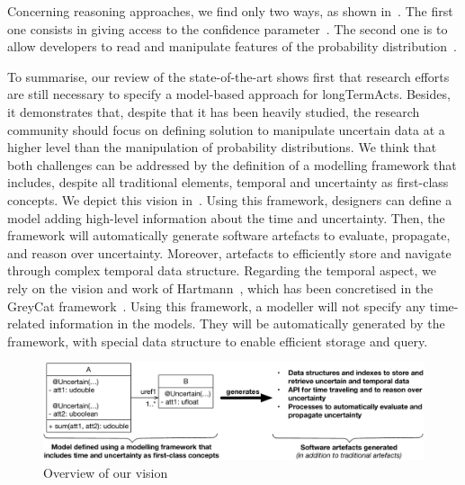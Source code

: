 Concerning reasoning approaches, we find only two ways, as shown in~.
The first one consists in giving access to the confidence parameter~\cite{DBLP:conf/models/BurguenoBMV18, DBLP:conf/ecmdafa/BertoaMBBTV18, DBLP:conf/sle/MayerhoferWV16, DBLP:conf/quatic/VallecilloMO16, DBLP:journals/tkde/BarbaraGP92, DBLP:conf/uist/SchwarzMH11}.
The second one is to allow developers to read and manipulate features of the probability distribution~\cite{baudin2017openturns, DBLP:conf/asplos/BornholtMM14, DBLP:journals/corr/BorgstromGGMG13, osti_1430202, DBLP:journals/peerj-cs/SalvatierWF16, DBLP:conf/popl/BhatAVG12, DBLP:conf/aistats/ChagantyNR13, DBLP:journals/siamsc/JaroszewiczK12, DBLP:journals/toplas/ParkPT08, DBLP:conf/ijcai/Pfeffer01, DBLP:conf/popl/RamseyP02, DBLP:conf/pldi/SankaranarayananCG13, DBLP:conf/icra/Thrun00, DBLP:journals/sac/LunnTBS00, plummer2003jags}.

To summarise, our review of the state-of-the-art shows first that research efforts are still necessary to specify a model-based approach for \glspl{longTermAct}.
Besides, it demonstrates that, despite that it has been heavily studied, the research community should focus on defining solution to manipulate uncertain data at a higher level than the manipulation of probability distributions.
We think that both challenges can be addressed by the definition of a modelling framework that includes, despite all traditional elements, temporal and uncertainty as first-class concepts.
We depict this vision in~.
Using this framework, designers can define a model adding high-level information about the time and uncertainty.
Then, the framework will automatically generate software artefacts to evaluate, propagate, and reason over uncertainty.
Moreover, artefacts to efficiently store and navigate through complex temporal data structure.
Regarding the temporal aspect, we rely on the vision and work of Hartmann~\cite{DBLP:phd/basesearch/Hartmann16}, which has been concretised in the GreyCat framework~\cite{DBLP:journals/is/HartmannFMRT19}.
Using this framework, a modeller will not specify any time-related information in the models.
They will be automatically generated by the framework, with special data structure to enable efficient storage and query.

\begin{figure}
	\centering
	\includegraphics[width=\linewidth]{img/chapt-vision/vision}
	\caption{Overview of our vision}
	\label{fig:vision:vision}
\end{figure}


